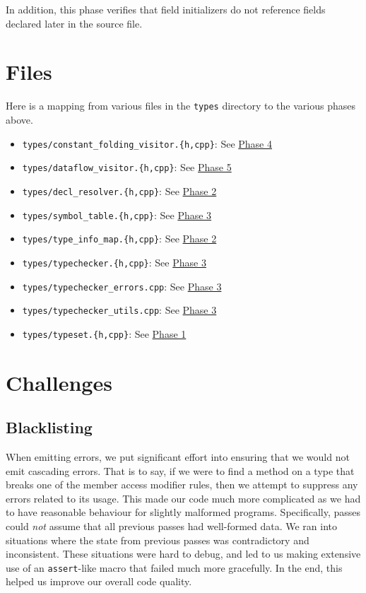 \documentclass[12pt, titlepage]{article}
\newcommand{\z}[1]{\texttt{#1}}
\begin{document}
In addition, this phase verifies that field initializers do not reference
fields declared later in the source file.

\section{Files}

Here is a mapping from various files in the \z{types} directory to the various
phases above.

\begin{itemize}
  \item \z{types/constant\_folding\_visitor.\{h,cpp\}}: See \hyperref[subsubsec:const-prop]{Phase 4}
  \item \z{types/dataflow\_visitor.\{h,cpp\}}: See \hyperref[subsubsec:data-flow]{Phase 5}
  \item \z{types/decl\_resolver.\{h,cpp\}}: See \hyperref[subsubsec:fields]{Phase 2}
  \item \z{types/symbol\_table.\{h,cpp\}}: See \hyperref[subsubsec:type-checking]{Phase 3}
  \item \z{types/type\_info\_map.\{h,cpp\}}: See \hyperref[subsubsec:fields]{Phase 2}
  \item \z{types/typechecker.\{h,cpp\}}: See \hyperref[subsubsec:type-checking]{Phase 3}
  \item \z{types/typechecker\_errors.cpp}: See \hyperref[subsubsec:type-checking]{Phase 3}
  \item \z{types/typechecker\_utils.cpp}: See \hyperref[subsubsec:type-checking]{Phase 3}
  \item \z{types/typeset.\{h,cpp\}}: See \hyperref[subsubsec:col-types]{Phase 1}
\end{itemize}

\section{Challenges}

\subsection{Blacklisting}

When emitting errors, we put significant effort into ensuring that we would not
emit cascading errors. That is to say, if we were to find a method on a type
that breaks one of the member access modifier rules, then we attempt to
suppress any errors related to its usage. This made our code much more
complicated as we had to have reasonable behaviour for slightly malformed
programs. Specifically, passes could \emph{not} assume that all previous passes
had well-formed data. We ran into situations where the state from previous
passes was contradictory and inconsistent. These situations were hard to debug,
and led to us making extensive use of an \z{assert}-like macro that failed much
more gracefully. In the end, this helped us improve our overall code quality.
\end{document}

